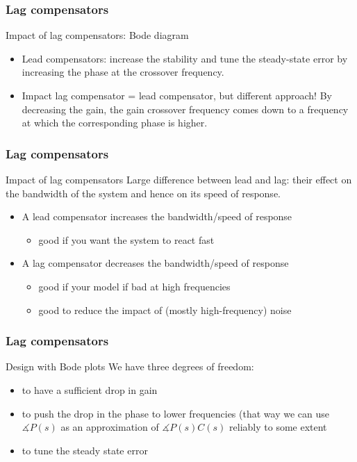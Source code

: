 \begin{frame}
	\frametitle{Lag compensators}
	\begin{block}{Impact of lag compensators: Bode diagram}
	\begin{itemize}
		\item Lead compensators: increase the stability and tune the steady-state error by increasing the phase at the crossover frequency.
		\item Impact lag compensator = lead compensator, but different approach!
		By decreasing the gain, the gain crossover frequency comes down to a frequency at which the corresponding phase is higher.
		
	\end{itemize}
	\end{block}
\end{frame}

\begin{frame}
	\frametitle{Lag compensators}
	\begin{block}{Impact of lag compensators}
		Large difference between lead and lag: their effect on the bandwidth of the system and hence on its speed of response.
		\begin{itemize}
			\item A lead compensator increases the bandwidth/speed of response 
			\begin{itemize} 
			\item good if you want the system to react fast
			\end{itemize}
			\item A lag compensator decreases the bandwidth/speed of response 
			\begin{itemize}
			\item good if your model if bad at high frequencies
			\item good to reduce the impact of (mostly high-frequency) noise 
			\end{itemize}
		\end{itemize}
	\end{block}
\end{frame}

\begin{frame}
\frametitle{Lag compensators}
\begin{block}{Design with Bode plots}
We have three degrees of freedom:
\begin{itemize}
	\item to have a sufficient drop in gain
	\item to push the drop in the phase to lower frequencies (that way we can use $\measuredangle P(s)$ as an approximation of $\measuredangle P(s)C(s)$ reliably to some extent
	\item to tune the steady state error
\end{itemize}
		
\end{block}
\end{frame}

